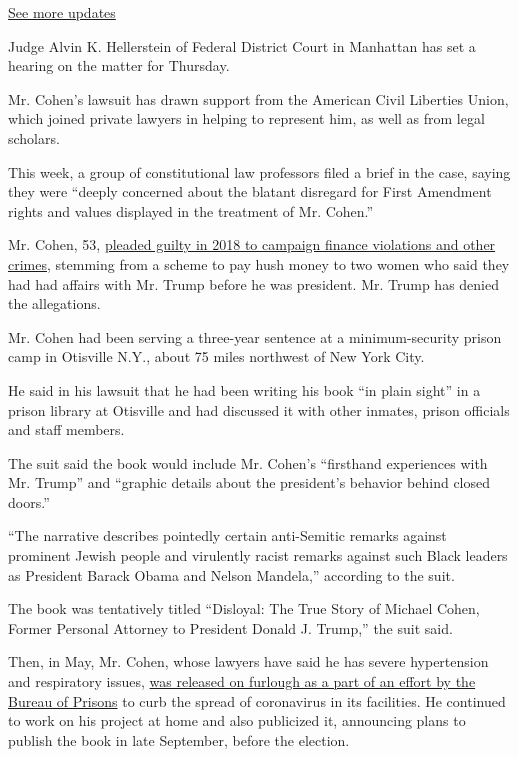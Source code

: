 \href{https://www.nytimes3xbfgragh.onion/2020/08/03/us/elections/biden-vs-trump.html?action=click\&pgtype=Article\&state=default\&region=MAIN_CONTENT_1\&context=storylines_live_updates}{See
more updates}

Judge Alvin K. Hellerstein of Federal District Court in Manhattan has
set a hearing on the matter for Thursday.

Mr. Cohen's lawsuit has drawn support from the American Civil Liberties
Union, which joined private lawyers in helping to represent him, as well
as from legal scholars.

This week, a group of constitutional law professors filed a brief in the
case, saying they were ``deeply concerned about the blatant disregard
for First Amendment rights and values displayed in the treatment of Mr.
Cohen.''

Mr. Cohen, 53,
\href{https://www.nytimes3xbfgragh.onion/2018/08/21/nyregion/michael-cohen-guilty-plea-trump-takeaways.html}{pleaded
guilty in 2018 to campaign finance violations and other crimes},
stemming from a scheme to pay hush money to two women who said they had
had affairs with Mr. Trump before he was president. Mr. Trump has denied
the allegations.

Mr. Cohen had been serving a three-year sentence at a minimum-security
prison camp in Otisville N.Y., about 75 miles northwest of New York
City.

He said in his lawsuit that he had been writing his book ``in plain
sight'' in a prison library at Otisville and had discussed it with other
inmates, prison officials and staff members.

The suit said the book would include Mr. Cohen's ``firsthand experiences
with Mr. Trump'' and ``graphic details about the president's behavior
behind closed doors.''

``The narrative describes pointedly certain anti-Semitic remarks against
prominent Jewish people and virulently racist remarks against such Black
leaders as President Barack Obama and Nelson Mandela,'' according to the
suit.

The book was tentatively titled ``Disloyal: The True Story of Michael
Cohen, Former Personal Attorney to President Donald J. Trump,'' the suit
said.

Then, in May, Mr. Cohen, whose lawyers have said he has severe
hypertension and respiratory issues,
\href{https://www.nytimes3xbfgragh.onion/2020/05/20/nyregion/michael-cohen-coronavirus-prison-release.html}{was
released on furlough as a part of an effort by the Bureau of Prisons} to
curb the spread of coronavirus in its facilities. He continued to work
on his project at home and also publicized it, announcing plans to
publish the book in late September, before the election.

